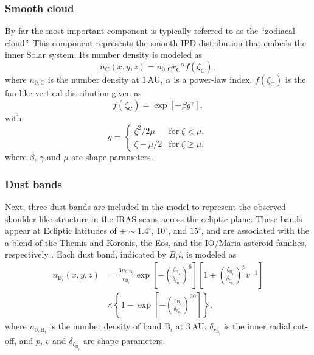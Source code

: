 \documentclass[twocolumn]{aa}
\begin{document}
\subsubsection{Smooth cloud}
By far the most important component is typically referred to as the
``zodiacal cloud''. This component represents the smooth IPD
distribution that embeds the inner Solar system. Its number density is
modeled as
\begin{equation}
    n_\mathrm{C}(x,y,z)=n_{0,
      \mathrm{C}}r_\mathrm{C}^{-\alpha}f(\zeta_\mathrm{C}),
    \label{eq:cloud}
\end{equation}
where $n_{0, \mathrm{C}}$ is the number density at 1\,AU, $\alpha$ is a 
power-law index, $f(\zeta_\mathrm{C})$ is the fan-like vertical 
distribution given as 
\begin{equation}
    f(\zeta_\mathrm{C}) = \exp {\left[-\beta g^\gamma \right]},
\end{equation}
with
\begin{equation}
    g = \begin{cases}
        \zeta^2/2\mu & \mathrm{for}\; \zeta < \mu,\\
        \zeta - \mu/2 & \mathrm{for}\; \zeta \geq \mu,
    \end{cases}
\end{equation}
where $\beta$, $\gamma$ and $\mu$ are shape parameters.

\subsubsection{Dust bands}
Next, three dust bands are included in the model to represent the
observed shoulder-like structure in the IRAS scans across the ecliptic
plane.  These bands appear at Ecliptic latitudes of $\pm \sim
1.4^\circ$, $10^\circ$, and $15^\circ$, and are associated with the
a blend of the Themis and Koronis, the Eos, and the IO/Maria asteroid families, 
respectively \citep{Reach1997}. Each dust band, indicated by $B_ii$, is 
modeled as
\begin{align}
    n_{\mathrm{B}_i}(x,y,z) &= \frac{3 n_{0, \mathrm{B}_i}}{r_{\mathrm{B}_i}} \exp \left[-\left(\frac{\zeta_{\mathrm{B}_i}}{\delta_{\zeta_{\mathrm{B}_i}}}\right)^{6}\right]\left[1 + \left(\frac{\zeta_{\mathrm{B}_i}}{\delta_{\zeta_{\mathrm{B}_i}}}\right)^{p}v^{-1}\right] \\
    &\times\left\{1-\exp \left[-\left(\frac{r_{\mathrm{B}_i}}{\delta_{r_{\mathrm{B}_i}}}\right)^{20}\right]\right\},
\label{eq:band}
\end{align}
where $n_{0, \mathrm{B}_i}$ is the number density of band $\mathrm{B}_i$ 
at 3\,AU, $\delta_{r_{\mathrm{B}_i}}$ is the inner radial cut-off, and 
$p$, $v$ and $\delta_{\zeta_{\mathrm{B}_i}}$ are shape parameters.
\end{document}
